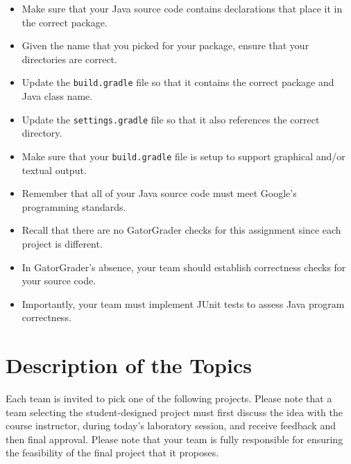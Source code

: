 \documentclass[11pt]{article}
\newcommand{\program}[1]{\lstinline{#1}}
\begin{document}
\begin{itemize}
  \setlength{\itemsep}{0in}
  \item Make sure that your Java source code contains declarations that place it in the correct package.
  \item Given the name that you picked for your package, ensure that your directories are correct.
  \item Update the \program{build.gradle} file so that it contains the correct package and Java class name.
  \item Update the \program{settings.gradle} file so that it also references the correct directory.
  \item Make sure that your \program{build.gradle} file is setup to support graphical and/or textual output.
  \item Remember that all of your Java source code must meet Google's programming standards.
  \item Recall that there are no GatorGrader checks for this assignment since each project is different.
  \item In GatorGrader's absence, your team should establish correctness checks for your source code.
  \item Importantly, your team must implement JUnit tests to assess
    Java program correctness.
\end{itemize}

\section*{Description of the Topics}

Each team is invited to pick one of the following projects. Please note that a
team selecting the student-designed project must first discuss the idea with the
course instructor, during today's laboratory session, and receive feedback and
then final approval. Please note that your team is fully responsible for
ensuring the feasibility of the final project that it proposes.

\end{document}
